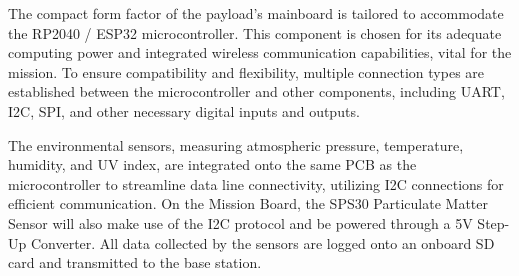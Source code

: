 The compact form factor of the payload's mainboard is tailored to accommodate the RP2040 / ESP32 microcontroller. This component is chosen for its adequate computing power and integrated wireless communication capabilities, vital for the mission. To ensure compatibility and flexibility, multiple connection types are established between the microcontroller and other components, including UART, I2C, SPI, and other necessary digital inputs and outputs.

The environmental sensors, measuring atmospheric pressure, temperature, humidity, and UV index, are integrated onto the same PCB as the microcontroller to streamline data line connectivity, utilizing I2C connections for efficient communication. On the Mission Board, the SPS30 Particulate Matter Sensor will also make use of the I2C protocol and be powered through a 5V Step-Up Converter. All data collected by the sensors are logged onto an onboard SD card and transmitted to the base station.


